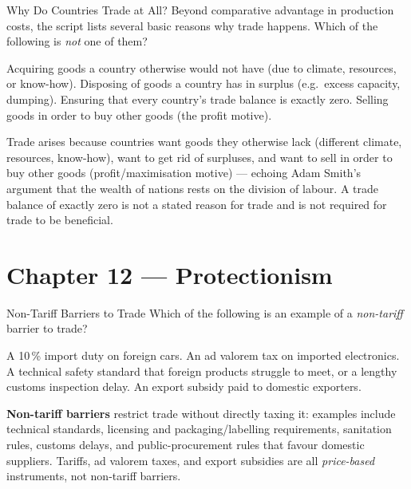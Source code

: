 \begin{question}[type=mc]{Why Do Countries Trade at All?}
Beyond comparative advantage in production costs, the script lists several
basic reasons why trade happens. Which of the following is \emph{not} one of
them?
\begin{choices}
  \choice        Acquiring goods a country otherwise would not have (due to
                 climate, resources, or know-how).
  \choice        Disposing of goods a country has in surplus (e.g.\ excess
                 capacity, dumping).
  \correctchoice Ensuring that every country's trade balance is exactly zero.
  \choice        Selling goods in order to buy other goods (the profit
                 motive).
\end{choices}
\begin{solution}
  Trade arises because countries want goods they otherwise lack (different
  climate, resources, know-how), want to get rid of surpluses, and want to
  sell in order to buy other goods (profit/maximisation motive) — echoing
  Adam Smith's argument that the wealth of nations rests on the division of
  labour. A trade balance of exactly zero is not a stated reason for trade
  and is not required for trade to be beneficial.
\end{solution}
\end{question}


\section{Chapter 12 — Protectionism}

\begin{question}[type=mc]{Non-Tariff Barriers to Trade}
Which of the following is an example of a \emph{non-tariff} barrier to
trade?
\begin{choices}
  \choice        A 10\,\% import duty on foreign cars.
  \choice        An ad valorem tax on imported electronics.
  \correctchoice A technical safety standard that foreign products struggle
                 to meet, or a lengthy customs inspection delay.
  \choice        An export subsidy paid to domestic exporters.
\end{choices}
\begin{solution}
  \textbf{Non-tariff barriers} restrict trade without directly taxing it:
  examples include technical standards, licensing and packaging/labelling
  requirements, sanitation rules, customs delays, and public-procurement
  rules that favour domestic suppliers. Tariffs, ad valorem taxes, and
  export subsidies are all \emph{price-based} instruments, not non-tariff
  barriers.
\end{solution}
\end{question}

